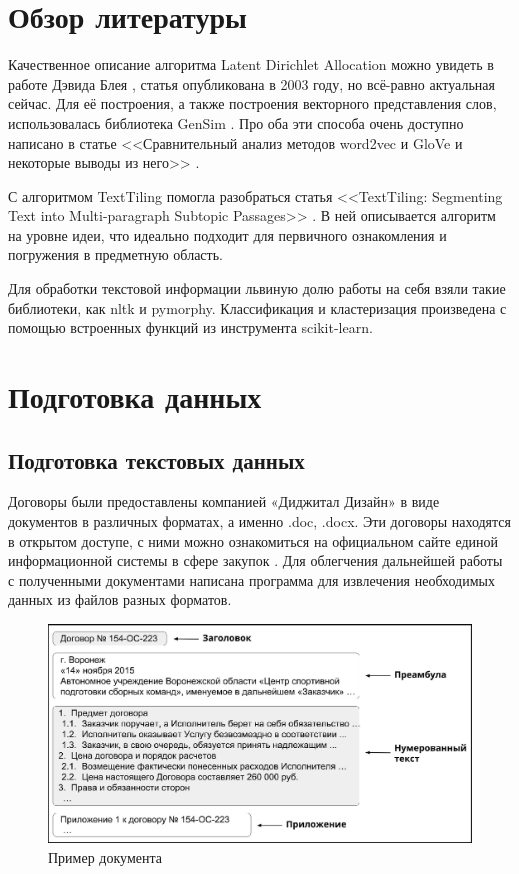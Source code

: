\documentclass[14pt]{matmex-diploma-custom}
\begin{document}
\newpage
\section*{Обзор литературы}
Качественное описание алгоритма Latent Dirichlet Allocation можно увидеть в работе Дэвида Блея \cite{lda}, статья опубликована в 2003 году, но всё-равно актуальная сейчас. Для её построения, а также построения векторного представления слов, использовалась библиотека GenSim \cite{gensim}. Про оба эти способа очень доступно написано в статье <<Сравнительный анализ методов word2vec и GloVe и некоторые выводы из него>> \cite{maslovskaya}.

С алгоритмом TextTiling помогла разобраться статья <<TextTiling: \linebreak Segmenting Text into Multi-paragraph Subtopic Passages>> \cite{texttiling}. В ней описывается алгоритм на уровне идеи, что идеально подходит для первичного ознакомления и погружения в предметную область. 

Для обработки текстовой информации львиную долю работы на себя взяли такие библиотеки, как nltk и pymorphy. Классификация и кластеризация произведена с помощью встроенных функций из инструмента scikit-learn.


\newpage
\section{Подготовка данных}
\subsection{Подготовка текстовых данных}
Договоры были предоставлены компанией «Диджитал Дизайн» \cite{dd} в виде документов в различных форматах, а именно .doc, .docx. Эти договоры находятся в открытом доступе, с ними можно ознакомиться на официальном сайте единой информационной системы в сфере закупок \cite{zakupki}. Для облегчения дальнейшей работы с полученными документами написана программа для извлечения необходимых данных из файлов разных форматов. 

\vspace{5pt}
\begin{figure}[h]
	\includegraphics[scale=0.74]{images/im1.eps}
	\caption{Пример документа}
	\label{im1}
\end{figure}
\vspace{5pt}
\end{document}
